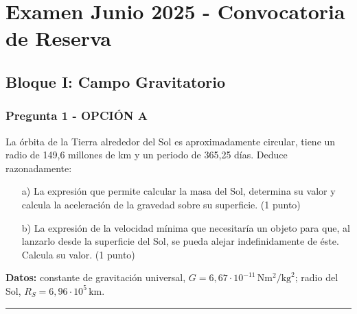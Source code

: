 \chapter{Examen Junio 2025 - Convocatoria de Reserva}
\label{chap:2025_jun_res}

\section{Bloque I: Campo Gravitatorio}
\label{sec:grav_2025_jun_res}

\subsection{Pregunta 1 - OPCIÓN A}
\label{subsec:1A_2025_jun_res}

\begin{cajaenunciado}
La órbita de la Tierra alrededor del Sol es aproximadamente circular, tiene un radio de 149,6 millones de km y un periodo de 365,25 días. Deduce razonadamente:
\begin{enumerate}
    \item[a)] La expresión que permite calcular la masa del Sol, determina su valor y calcula la aceleración de la gravedad sobre su superficie. (1 punto)
    \item[b)] La expresión de la velocidad mínima que necesitaría un objeto para que, al lanzarlo desde la superficie del Sol, se pueda alejar indefinidamente de éste. Calcula su valor. (1 punto)
\end{enumerate}
\textbf{Datos:} constante de gravitación universal, $G=6,67\cdot10^{-11}\,\text{N}\text{m}^2/\text{kg}^2$; radio del Sol, $R_S=6,96\cdot10^{5}\,\text{km}$.
\end{cajaenunciado}
\hrule

